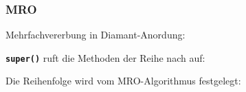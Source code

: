 \subsubsection{MRO}
Mehrfachvererbung in Diamant-Anordung:

\texttt{\textbf{super()}} ruft die Methoden der Reihe nach auf:

Die Reihenfolge wird vom MRO-Algorithmus festgelegt:

